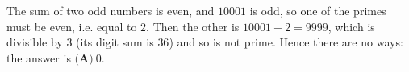 The sum of two odd numbers is even, and $10001$ is odd, so one of the primes must be even, i.e. equal to $2$. Then the other is $10001-2=9999$, which is divisible by $3$ (its digit sum is $36$) and so is not prime. Hence there are no ways: the answer is $\boxed{\textbf{(A)}\ 0}$.
